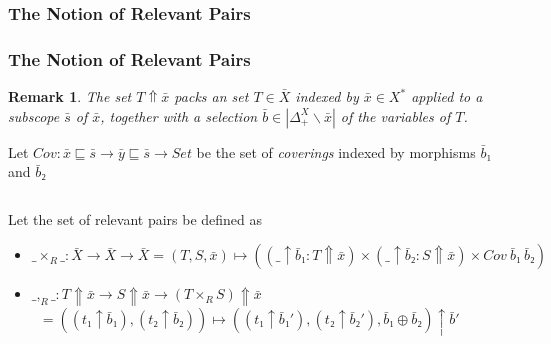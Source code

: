 \documentclass[aspectratio=169]{beamer}
\theoremstyle{remarkstyle}
\newtheorem*{remark}{Remark}
\begin{document}
\frametitle{The Notion of Relevant Pairs}
\begin{frame}[fragile]
  \frametitle{The Notion of Relevant Pairs}
  \begin{remark}
    The set $T⇑\bar{x}$ packs an set $T ∈ \bar{X}$ indexed by $\bar{x} ∈ X^*$ applied to a subscope $\bar{s}$ of $\bar{x}$, together with a selection $\bar{b} ∈ |Δ_+^X∖\bar{x}|$ of the variables of $T$.
  \end{remark}
  \begin{definition}
    Let $Cov : \bar{x} ⊑ \bar{s} → \bar{y} ⊑ \bar{s} → Set$ be the set of \emph{coverings} indexed by morphisms $\bar{b}₁$ and $\bar{b}₂$
    \begin{columns}
      \begin{column}{0.2\textwidth}
        \begin{center}
        \end{center}
      \end{column}
      \begin{column}{0.2\textwidth}
        \begin{center}
        \end{center}
      \end{column}
      \begin{column}{0.2\textwidth}
        \begin{center}
        \end{center}
      \end{column}
      \begin{column}{0.2\textwidth}
        \begin{center}
        \end{center}
      \end{column}
    \end{columns}
    Let the set of relevant pairs be defined as 
    \begin{itemize}
      \item $\_×_R\_ : \bar{X} → \bar{X} → \bar{X}  = (T, S, \bar{x}) ↦ ((\_ ↑ \bar{b}₁ : T ⇑ \bar{x}) × (\_ ↑ \bar{b}₂ : S ⇑ \bar{x}) × Cov \ \bar{b}₁ \ \bar{b}₂)$
      \item $\_,_R\_ : T ⇑ \bar{x} → S ⇑ \bar{x} → (T ×_R S) ⇑ \bar{x}$ 
      \\ \quad \quad \ $= (( t₁ ↑ \bar{b}₁), (t₂ ↑ \bar{b}₂)) ↦  ((t₁ ↑ \bar{b}₁') , (t₂ ↑ \bar{b}₂'), \bar{b}₁ ⊕ \bar{b}₂) ↑ \bar{b}'$ \\ 
    \end{itemize}
  \end{definition}
  
\end{frame}
\end{document}
